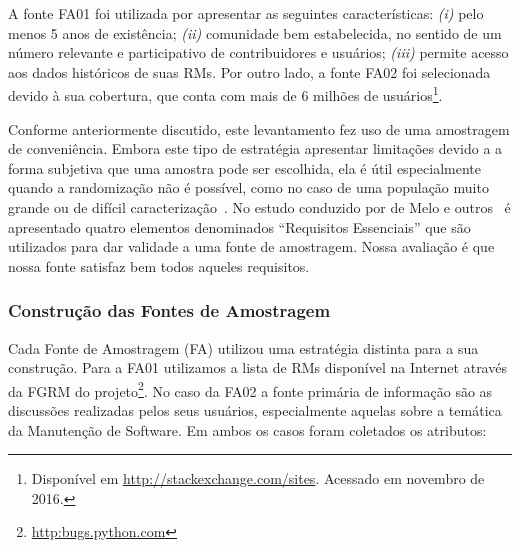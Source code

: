 A fonte FA01 foi utilizada por apresentar as seguintes características:
\textit{(i)} pelo menos 5 anos de existência; \textit{(ii)} comunidade bem
estabelecida, no sentido de um número relevante e participativo de
contribuidores e usuários; \textit{(iii)} permite acesso aos dados históricos de
suas RMs. Por outro lado, a fonte FA02 foi selecionada devido à sua cobertura,
que conta com mais de 6 milhões de usuários\footnote{Disponível em
    \url{http://stackexchange.com/sites}. Acessado em novembro de 2016.}.

Conforme anteriormente discutido, este levantamento fez uso de uma amostragem de
conveniência. Embora este tipo de estratégia apresentar limitações devido a a
forma subjetiva que uma amostra pode ser escolhida, ela é útil especialmente
quando a randomização não é possível, como no caso de uma população muito grande
ou de difícil caracterização~\cite{boxill1997introduction}. No estudo conduzido
por de Melo e outros~\cite{de2014towards} é apresentado quatro elementos
denominados ``Requisitos Essenciais'' que são utilizados para dar validade a uma
fonte de amostragem. Nossa avaliação é que nossa fonte satisfaz bem todos
aqueles requisitos.



\subsubsection{Construção das Fontes de Amostragem}
\label{subsubsec:construcao_fonte_amostragem}

Cada Fonte de Amostragem (FA) utilizou uma estratégia distinta para a sua
construção. Para a FA01 utilizamos a lista de RMs disponível na Internet através
da FGRM do projeto\footnote{\url{http:bugs.python.com}}. No caso da FA02 a fonte
primária de informação são as discussões realizadas pelos seus usuários,
especialmente aquelas sobre a temática da Manutenção de Software. Em ambos os
casos foram coletados os atributos:

